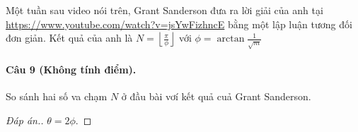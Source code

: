 \documentclass[11pt]{article}
\begin{document}
Một tuần sau video nói trên, Grant Sanderson đưa ra lời giải của anh tại
\url{https://www.youtube.com/watch?v=jsYwFizhncE} bằng một lập luận tương đối đơn giản. Kết quả của
anh là \(N = \left \lfloor \frac{\pi}{\phi} \right\rfloor\) với \(\phi = \arctan
\frac{1}{\sqrt{m}}\)

\paragraph{Câu 9 (Không tính điểm).}
\label{sec:org99e9f8f}
So sánh hai số va chạm \(N\) ở đầu bài vơí kết quả cuả Grant Sanderson.
\begin{proof}[Đáp án.]
\(\theta = 2\phi\).
\end{proof}
\end{document}
